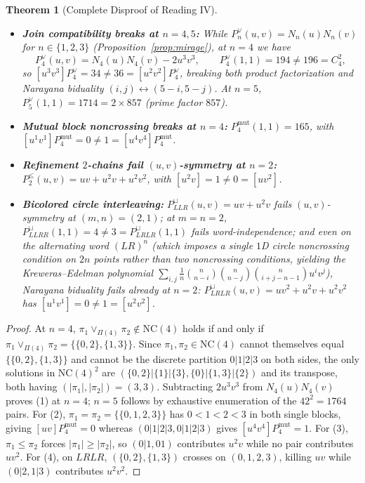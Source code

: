 \documentclass[11pt]{article}
\theoremstyle{plain}
\newtheorem{theorem}{Theorem}[section]
\theoremstyle{definition}
\newcommand{\NC}{\mathrm{NC}}
\begin{document}
\begin{theorem}[Complete Disproof of Reading IV]\label{thm:coupled-disproof}
\leavevmode
\begin{itemize}\setlength{\itemsep}{2pt}
  \item[(1)] \textbf{Join compatibility breaks at $n = 4, 5$:} While $P_n^{\vee}(u, v) = N_n(u) N_n(v)$ for $n \in \{1, 2, 3\}$ (Proposition~\ref{prop:mirage}), at $n = 4$ we have
  \[
    P_4^{\vee}(u, v) = N_4(u) N_4(v) - 2 u^3 v^3, \qquad P_4^{\vee}(1, 1) = 194 \ne 196 = C_4^2,
  \]
  so $[u^3 v^3] P_4^{\vee} = 34 \ne 36 = [u^2 v^2] P_4^{\vee}$, breaking both product factorization and Narayana biduality $(i, j) \leftrightarrow (5 - i, 5 - j)$. At $n = 5$, $P_5^{\vee}(1, 1) = 1714 = 2 \times 857$ (prime factor $857$).
  \item[(2)] \textbf{Mutual block noncrossing breaks at $n = 4$:} $P_4^{\mathrm{mut}}(1, 1) = 165$, with $[u^1 v^1] P_4^{\mathrm{mut}} = 0 \ne 1 = [u^4 v^4] P_4^{\mathrm{mut}}$.
  \item[(3)] \textbf{Refinement $2$-chains fail $(u, v)$-symmetry at $n = 2$:} $P_2^{\le}(u, v) = uv + u^2v + u^2v^2$, with $[u^2 v] = 1 \ne 0 = [u v^2]$.
  \item[(4)] \textbf{Bicolored circle interleaving:} $P_{LLR}^{\sqcup}(u, v) = uv + u^2v$ fails $(u, v)$-symmetry at $(m, n) = (2, 1)$; at $m = n = 2$, $P_{LLRR}^{\sqcup}(1, 1) = 4 \ne 3 = P_{LRLR}^{\sqcup}(1, 1)$ fails word-independence; and even on the alternating word $(LR)^n$ (which imposes a single $1$D circle noncrossing condition on $2n$ points rather than two noncrossing conditions, yielding the Kreweras--Edelman polynomial $\sum_{i,j} \frac{1}{n}\binom{n}{n-i}\binom{n}{n-j}\binom{n}{i+j-n-1} u^i v^j$), Narayana biduality fails already at $n = 2$: $P_{LRLR}^{\sqcup}(u, v) = uv^2 + u^2v + u^2v^2$ has $[u^1 v^1] = 0 \ne 1 = [u^2 v^2]$.
\end{itemize}
\end{theorem}
\begin{proof}
At $n = 4$, $\pi_1 \vee_{\Pi(4)} \pi_2 \notin \NC(4)$ holds if and only if $\pi_1 \vee_{\Pi(4)} \pi_2 = \{\{0, 2\}, \{1, 3\}\}$. Since $\pi_1, \pi_2 \in \NC(4)$ cannot themselves equal $\{\{0, 2\}, \{1, 3\}\}$ and cannot be the discrete partition $0|1|2|3$ on both sides, the only solutions in $\NC(4)^2$ are $(\{0, 2\}|\{1\}|\{3\}, \{0\}|\{1, 3\}|\{2\})$ and its transpose, both having $(|\pi_1|, |\pi_2|) = (3, 3)$. Subtracting $2u^3v^3$ from $N_4(u) N_4(v)$ proves (1) at $n = 4$; $n = 5$ follows by exhaustive enumeration of the $42^2 = 1764$ pairs. For (2), $\pi_1 = \pi_2 = \{\{0, 1, 2, 3\}\}$ has $0 < 1 < 2 < 3$ in both single blocks, giving $[uv] P_4^{\mathrm{mut}} = 0$ whereas $(0|1|2|3, 0|1|2|3)$ gives $[u^4v^4] P_4^{\mathrm{mut}} = 1$. For (3), $\pi_1 \le \pi_2$ forces $|\pi_1| \ge |\pi_2|$, so $(0|1, 01)$ contributes $u^2v$ while no pair contributes $uv^2$. For (4), on $LRLR$, $(\{0, 2\}, \{1, 3\})$ crosses on $(0, 1, 2, 3)$, killing $uv$ while $(0|2, 1|3)$ contributes $u^2v^2$.
\end{proof}
\end{document}
